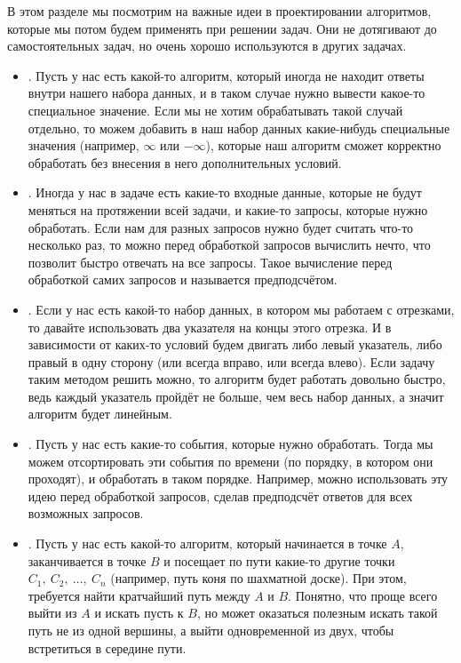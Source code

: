 В этом разделе мы посмотрим на важные идеи в проектировании алгоритмов, которые мы потом будем применять при решении задач. Они не дотягивают до самостоятельных задач, но очень хорошо используются в других задачах.

\begin{itemize}
    \item {}. Пусть у нас есть какой-то алгоритм, который иногда не находит ответы внутри нашего набора данных, и в таком случае нужно вывести какое-то специальное значение. Если мы не хотим обрабатывать такой случай отдельно, то можем добавить в наш набор данных какие-нибудь специальные значения (например, $\infty$ или $-\infty$), которые наш алгоритм сможет корректно обработать без внесения в него дополнительных условий.
    \item {}. Иногда у нас в задаче есть какие-то входные данные, которые не будут меняться на протяжении всей задачи, и какие-то запросы, которые нужно обработать. Если нам для разных запросов нужно будет считать что-то несколько раз, то можно перед обработкой запросов вычислить нечто, что позволит быстро отвечать на все запросы. Такое вычисление перед обработкой самих запросов и называется предподсчётом.
    \item {}. Если у нас есть какой-то набор данных, в котором мы работаем с отрезками, то давайте использовать два указателя на концы этого отрезка. И в зависимости от каких-то условий будем двигать либо левый указатель, либо правый в одну сторону (или всегда вправо, или всегда влево). Если задачу таким методом решить можно, то алгоритм будет работать довольно быстро, ведь каждый указатель пройдёт не больше, чем весь набор данных, а значит алгоритм будет линейным.
    \item {}. Пусть у нас есть какие-то события, которые нужно обработать. Тогда мы можем отсортировать эти события по времени (по порядку, в котором они проходят), и обработать в таком порядке. Например, можно использовать эту идею перед обработкой запросов, сделав предподсчёт ответов для всех возможных запросов.
    \item {}. Пусть у нас есть какой-то алгоритм, который начинается в точке $A$, заканчивается в точке $B$ и посещает по пути какие-то другие точки $C_1,\ C_2,\ \ldots,\ C_n$ (например, путь коня по шахматной доске). При этом, требуется найти кратчайший путь между $A$ и $B$. Понятно, что проще всего выйти из $A$ и искать пусть к $B$, но может оказаться полезным искать такой путь не из одной вершины, а выйти одновременной из двух, чтобы встретиться в середине пути.
\end{itemize}
